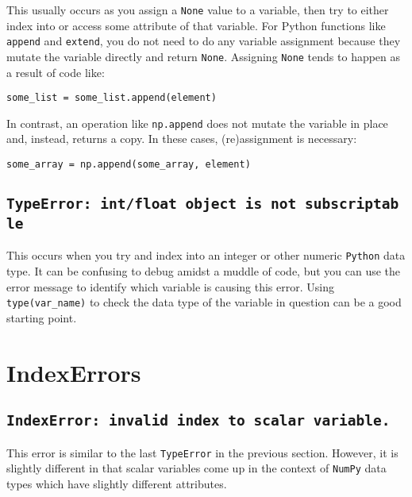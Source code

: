 \documentclass[
  letterpaper,
  DIV=11,
  numbers=noendperiod]{scrreprt}
\begin{document}
This usually occurs as you assign a \texttt{None} value to a variable,
then try to either index into or access some attribute of that variable.
For Python functions like \texttt{append} and \texttt{extend}, you do
not need to do any variable assignment because they mutate the variable
directly and return \texttt{None}. Assigning \texttt{None} tends to
happen as a result of code like:

\begin{verbatim}
some_list = some_list.append(element)
\end{verbatim}

In contrast, an operation like \texttt{np.append} does not mutate the
variable in place and, instead, returns a copy. In these cases,
(re)assignment is necessary:

\begin{verbatim}
some_array = np.append(some_array, element)
\end{verbatim}

\subsection{\texorpdfstring{\texttt{TypeError:\ \textquotesingle{}int\textquotesingle{}/\textquotesingle{}float\textquotesingle{}\ object\ is\ not\ subscriptable}}{TypeError: \textquotesingle int\textquotesingle/\textquotesingle float\textquotesingle{} object is not subscriptable}}\label{typeerror-intfloat-object-is-not-subscriptable}

This occurs when you try and index into an integer or other numeric
\texttt{Python} data type. It can be confusing to debug amidst a muddle
of code, but you can use the error message to identify which variable is
causing this error. Using \texttt{type(var\_name)} to check the data
type of the variable in question can be a good starting point.

\section{IndexErrors}\label{indexerrors}

\subsection{\texorpdfstring{\texttt{IndexError:\ invalid\ index\ to\ scalar\ variable.}}{IndexError: invalid index to scalar variable.}}\label{indexerror-invalid-index-to-scalar-variable.}

This error is similar to the last \texttt{TypeError} in the previous
section. However, it is slightly different in that scalar variables come
up in the context of \texttt{NumPy} data types which have slightly
different attributes.
\end{document}
